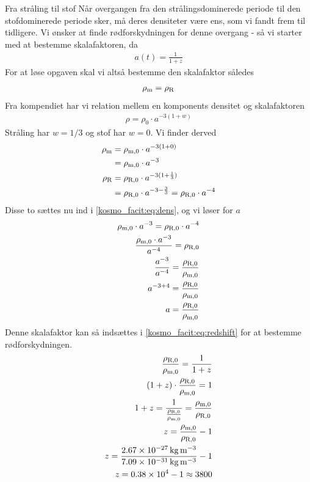 \documentclass[crop=false, class=memoir]{standalone}
\begin{document}
\begin{opgave}[4]{Fra stråling til stof}
\opg Når overgangen fra den strålingsdominerede periode til den stofdominerede periode sker, må deres densiteter være ens, som vi fandt frem til tidligere. Vi ønsker at finde rødforskydningen for denne overgang - så vi starter med at bestemme skalafaktoren, da
\begin{align}\label{kosmo_facit:eq:redshift}
    a(t) = \frac{1}{1+z}
\end{align}
For at løse opgaven skal vi altså bestemme den skalafaktor således 
\begin{align}\label{kosmo_facit:eq:dens}
    \rho_\textup{m} = \rho_\textup{R}
\end{align}
Fra kompendiet har vi relation mellem en komponents densitet og skalafaktoren
\begin{align}
    \rho = \rho_0 \cdot a^{-3(1+w)}
\end{align}
Stråling har $w = 1/3$ og stof har $w = 0$. Vi finder derved
\begin{align}
    \rho_{\textup{m}} &= \rho_{\textup{m},0} \cdot a^{-3(1+0)} \\
    &= \rho_{\textup{m},0} \cdot a^{-3} \\
    \rho_{\textup{R}} &= \rho_{\textup{R},0} \cdot a^{-3(1+\frac{1}{3})} \\
    &= \rho_{\textup{R},0} \cdot a^{-3 - \frac{3}{3}} = \rho_{\textup{R},0} \cdot a^{-4}
\end{align}
Disse to sættes nu ind i \cref{kosmo_facit:eq:dens}, og vi løser for $a$
\begin{align}
    \rho_{\textup{m},0}\cdot a^{-3} = \rho_{\textup{R},0} \cdot a^{-4} \\
    \frac{\rho_{\textup{m},0}\cdot a^{-3}}{a^{-4}} = \rho_{\textup{R},0} \\
    \frac{a^{-3}}{a^{-4}} = \frac{\rho_{\textup{R},0}}{\rho_{\textup{m},0}} \\
    a^{-3 + 4} = \frac{\rho_{\textup{R},0}}{\rho_{\textup{m},0}} \\
    a = \frac{\rho_{\textup{R},0}}{\rho_{\textup{m},0}}
\end{align}
Denne skalafaktor kan så indsættes i \cref{kosmo_facit:eq:redshift} for at bestemme rødforskydningen.
\begin{align}
    \frac{\rho_{\textup{R},0}}{\rho_{\textup{m},0}} = \frac{1}{1+z} \\
    (1+z)\cdot \frac{\rho_{\textup{R},0}}{\rho_{\textup{m},0}} = 1\\
    1+z = \frac{1}{\frac{\rho_{\textup{R},0}}{\rho_{\textup{m},0}}} = \frac{\rho_{\textup{m},0}}{\rho_{\textup{R},0}}\\
    z = \frac{\rho_{\textup{m},0}}{\rho_{\textup{R},0}} - 1\\
    z = \frac{\SI{2,67e-27}{\kilogram \per \cubic \metre}}{\SI{7,09e-31}{\kilogram \per \cubic \metre}} -1\\
    z =  \num{0.38e4} - 1 \approx 3800
\end{align}
\end{opgave}
\end{document}
